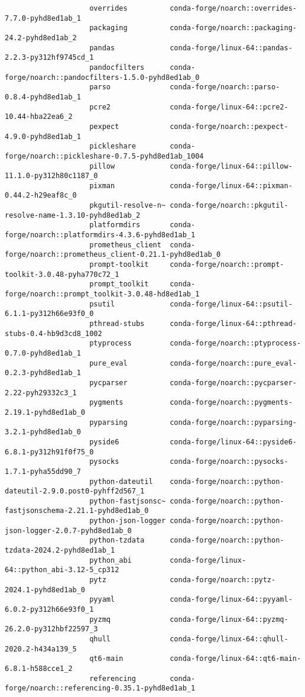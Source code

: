 \documentclass{article}
\begin{document}
\begin{enumerate}
\begin{itemize}
\begin{itemize}
\begin{itemize}
\begin{verbatim}
					overrides          conda-forge/noarch::overrides-7.7.0-pyhd8ed1ab_1 
					packaging          conda-forge/noarch::packaging-24.2-pyhd8ed1ab_2 
					pandas             conda-forge/linux-64::pandas-2.2.3-py312hf9745cd_1 
					pandocfilters      conda-forge/noarch::pandocfilters-1.5.0-pyhd8ed1ab_0 
					parso              conda-forge/noarch::parso-0.8.4-pyhd8ed1ab_1 
					pcre2              conda-forge/linux-64::pcre2-10.44-hba22ea6_2 
					pexpect            conda-forge/noarch::pexpect-4.9.0-pyhd8ed1ab_1 
					pickleshare        conda-forge/noarch::pickleshare-0.7.5-pyhd8ed1ab_1004 
					pillow             conda-forge/linux-64::pillow-11.1.0-py312h80c1187_0 
					pixman             conda-forge/linux-64::pixman-0.44.2-h29eaf8c_0 
					pkgutil-resolve-n~ conda-forge/noarch::pkgutil-resolve-name-1.3.10-pyhd8ed1ab_2 
					platformdirs       conda-forge/noarch::platformdirs-4.3.6-pyhd8ed1ab_1 
					prometheus_client  conda-forge/noarch::prometheus_client-0.21.1-pyhd8ed1ab_0 
					prompt-toolkit     conda-forge/noarch::prompt-toolkit-3.0.48-pyha770c72_1 
					prompt_toolkit     conda-forge/noarch::prompt_toolkit-3.0.48-hd8ed1ab_1 
					psutil             conda-forge/linux-64::psutil-6.1.1-py312h66e93f0_0 
					pthread-stubs      conda-forge/linux-64::pthread-stubs-0.4-hb9d3cd8_1002 
					ptyprocess         conda-forge/noarch::ptyprocess-0.7.0-pyhd8ed1ab_1 
					pure_eval          conda-forge/noarch::pure_eval-0.2.3-pyhd8ed1ab_1 
					pycparser          conda-forge/noarch::pycparser-2.22-pyh29332c3_1 
					pygments           conda-forge/noarch::pygments-2.19.1-pyhd8ed1ab_0 
					pyparsing          conda-forge/noarch::pyparsing-3.2.1-pyhd8ed1ab_0 
					pyside6            conda-forge/linux-64::pyside6-6.8.1-py312h91f0f75_0 
					pysocks            conda-forge/noarch::pysocks-1.7.1-pyha55dd90_7 
					python-dateutil    conda-forge/noarch::python-dateutil-2.9.0.post0-pyhff2d567_1 
					python-fastjsonsc~ conda-forge/noarch::python-fastjsonschema-2.21.1-pyhd8ed1ab_0 
					python-json-logger conda-forge/noarch::python-json-logger-2.0.7-pyhd8ed1ab_0 
					python-tzdata      conda-forge/noarch::python-tzdata-2024.2-pyhd8ed1ab_1 
					python_abi         conda-forge/linux-64::python_abi-3.12-5_cp312 
					pytz               conda-forge/noarch::pytz-2024.1-pyhd8ed1ab_0 
					pyyaml             conda-forge/linux-64::pyyaml-6.0.2-py312h66e93f0_1 
					pyzmq              conda-forge/linux-64::pyzmq-26.2.0-py312hbf22597_3 
					qhull              conda-forge/linux-64::qhull-2020.2-h434a139_5 
					qt6-main           conda-forge/linux-64::qt6-main-6.8.1-h588cce1_2 
					referencing        conda-forge/noarch::referencing-0.35.1-pyhd8ed1ab_1 

\end{verbatim}
\end{itemize}
\end{itemize}
\end{itemize}
\end{enumerate}
\end{document}
